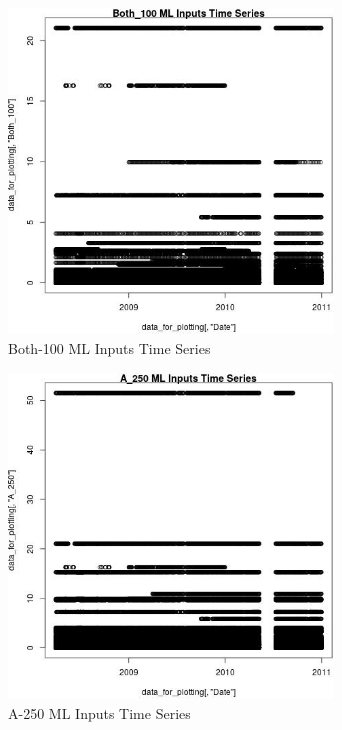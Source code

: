 \begin{figure} 
\centering  
\includegraphics[width=0.77\textwidth]{Code_Outputs/ML_input_report_ML_input_PM25_Step5_part_d_de_duplicated_aves_ML_input_Both_100vDate.jpg} 
\caption{\label{fig:ML_input_report_ML_input_PM25_Step5_part_d_de_duplicated_aves_ML_inputBoth_100vDate}Both-100 ML Inputs Time Series} 
\end{figure} 
 

\begin{figure} 
\centering  
\includegraphics[width=0.77\textwidth]{Code_Outputs/ML_input_report_ML_input_PM25_Step5_part_d_de_duplicated_aves_ML_input_A_250vDate.jpg} 
\caption{\label{fig:ML_input_report_ML_input_PM25_Step5_part_d_de_duplicated_aves_ML_inputA_250vDate}A-250 ML Inputs Time Series} 
\end{figure} 
 

